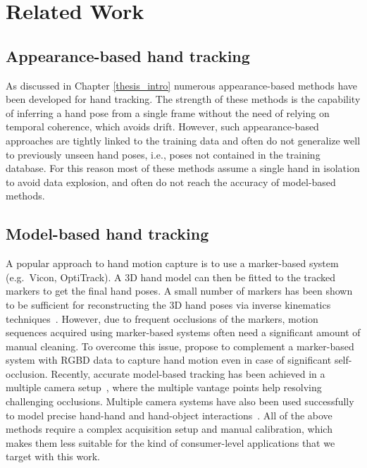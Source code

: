 

\section{Related Work}
\label{sec:htrack-related}


\subsection*{Appearance-based hand tracking} 
 
As discussed in Chapter \ref{thesis_intro} numerous appearance-based methods have been developed for hand tracking. 
The strength of these methods is the capability of inferring a hand pose from a single frame without the need of relying on temporal coherence, which avoids drift.
 However, such appearance-based approaches are tightly linked to the training data and often do not generalize well to previously unseen hand poses, i.e., poses not contained in the training database. For this reason most of these methods assume a single hand in isolation to avoid data explosion, and often do not reach the accuracy of model-based methods.

\subsection*{Model-based hand tracking}

A popular approach to hand motion capture is to use a marker-based system (e.g.\ Vicon, OptiTrack).  A 3D hand model can then be fitted to the tracked markers to get the final hand poses. A small number of markers has been shown to be sufficient for reconstructing the 3D hand poses via inverse kinematics techniques~\cite{Hoyet_i3d12}. However, due to frequent occlusions of the markers, motion sequences acquired using marker-based systems often need a significant amount of manual cleaning. To overcome this issue, \cite{zhao2012marker} propose to complement a marker-based system with RGBD data to capture hand motion even in case of significant self-occlusion.
Recently, accurate model-based tracking has been achieved in a multiple camera setup~\cite{sridhar2013multicam,sridhar2014anisotropic}, where the multiple vantage points help resolving challenging occlusions. Multiple camera systems have also been used successfully to model precise hand-hand and hand-object interactions~\cite{oiko_iccv11,ballan2013salient,wang2013physics}. All of the above methods require a complex acquisition setup and manual calibration, which makes them less suitable for the kind of consumer-level applications that we target with this work.

